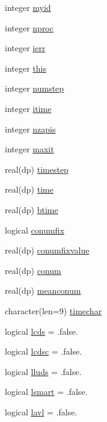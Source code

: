 \begin{DoxyCompactItemize}
integer \hyperlink{classparameters_aeaa510845dde7f4dc7f917a4ad50869d}{myid}
\item 
integer \hyperlink{classparameters_a7f21bebc70eaba4ad593bd189a55867a}{nproc}
\item 
integer \hyperlink{classparameters_a5516a3d69b56fa14f63ec7a2909f428b}{ierr}
\item 
integer \hyperlink{classparameters_a8192348218e79a6c3fc6d999588ab80e}{this}
\item 
integer \hyperlink{classparameters_a2a213735e1ce341ebcaa199d63b4f372}{numstep}
\item 
integer \hyperlink{classparameters_ac3fd2b2d6db1ca2089e68402d8d64eef}{itime}
\item 
integer \hyperlink{classparameters_a54bcfb1bc32ebc57cd129b4cfbf5ab15}{nzapis}
\item 
integer \hyperlink{classparameters_a4f0baeed32fb99420cf168d593553403}{maxit}
\item 
real(dp) \hyperlink{classparameters_ad35dcf7aed2b1a4ea8e1097cf5f1d0d7}{timestep}
\item 
real(dp) \hyperlink{classparameters_ab755811741695b6f3fd38824a931b4b3}{time}
\item 
real(dp) \hyperlink{classparameters_a76fa638958512a751a8bf818471774ac}{btime}
\item 
logical \hyperlink{classparameters_a84c9786af35a9874091df85c6af2ec7b}{conumfix}
\item 
real(dp) \hyperlink{classparameters_a7005277ef2b439f6eeb289bc45301138}{conumfixvalue}
\item 
real(dp) \hyperlink{classparameters_abd548d67fa8e554f370eb11f79ac900e}{conum}
\item 
real(dp) \hyperlink{classparameters_a5af225524d565854a9ad22c8e6a1b68e}{meanconum}
\item 
character(len=9) \hyperlink{classparameters_a2f04e591ca8173218918ed178afcfd04}{timechar}
\item 
logical \hyperlink{classparameters_ae2d36f2ac4fa52583c9d56a205bccb50}{lcds} = .false.
\item 
logical \hyperlink{classparameters_aacde0bf1551f1ea26ffc599425a07648}{lcdsc} = .false.
\item 
logical \hyperlink{classparameters_a28d8dc4054fc04f3a1ec64ea6639ec20}{lluds} = .false.
\item 
logical \hyperlink{classparameters_a7b90e4caa2113b4e7bd5017595b8a3af}{lsmart} = .false.
\item 
logical \hyperlink{classparameters_a735b36c63dfe2cda2cf67cb65a4a4e4c}{lavl} = .false.

\end{DoxyCompactItemize}

